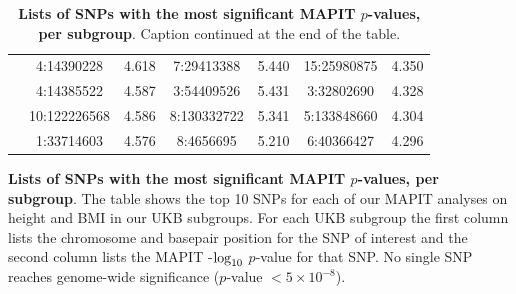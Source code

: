 \documentclass[12pt,a4paper]{article}
\def\log{{\rm log}}
\begin{document}
\begin{landscape}
\begin{table}[ht]
\begin{tabular}{ccccccc}
  & 4:14390228 & 4.618 & 7:29413388 & 5.440 & 15:25980875 & 4.350 \\ 
  & 4:14385522 & 4.587 & 3:54409526 & 5.431 & 3:32802690 & 4.328 \\ 
  & 10:122226568 & 4.586 & 8:130332722 & 5.341 & 5:133848660 & 4.304 \\ 
  & 1:33714603 & 4.576 & 8:4656695 & 5.210 & 6:40366427 & 4.296 \\ 
   \hline
\end{tabular}
\caption[TBD]{\textbf{Lists of SNPs with the most significant MAPIT $p$-values, per subgroup}. Caption continued at the end of the table.}
\label{InterPath-Supp-Table-MAPIT-TopSNPs-b}
\end{table}
\end{landscape}
\clearpage
\setlength{\footskip}{1cm}
\addtocounter{table}{-1}

\begin{table} [t!]
  \caption{\textbf{Lists of SNPs with the most significant MAPIT $p$-values, per subgroup}. The table shows the top 10 SNPs for each of our MAPIT analyses on height and BMI in our UKB subgroups. For each UKB subgroup the first column lists the chromosome and basepair position for the SNP of interest and the second column lists the MAPIT -$\log_{10}$ $p$-value for that SNP. No single SNP reaches genome-wide significance ($p$-value $< 5\times10^{-8}$).}
\label{InterPath-Supp-Table-MAPIT-TopSNPs-Caption}
\end{table}
\clearpage
\end{document}

